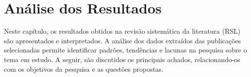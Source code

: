 \chapter{Análise dos Resultados}   
\label{ch:resultados}

Neste capítulo, os resultados obtidos na revisão sistemática da literatura (RSL) são apresentados e interpretados. A análise dos dados extraídos das publicações selecionadas permite identificar padrões, tendências e lacunas na pesquisa sobre o tema em estudo. A seguir, são discutidos os principais achados, relacionando-os com os objetivos da pesquisa e as questões propostas.







